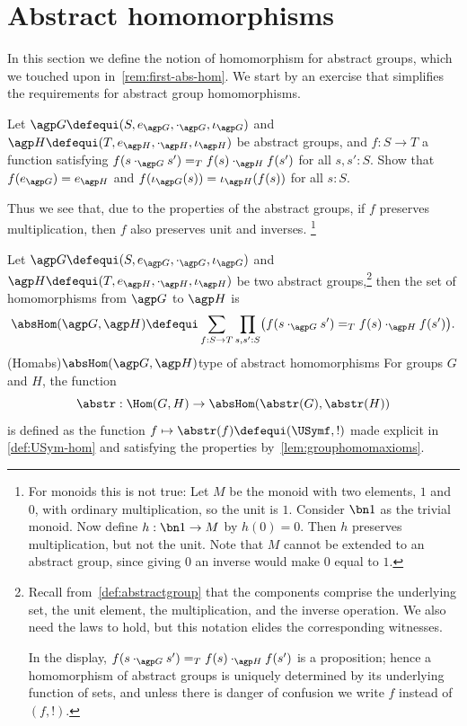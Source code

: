 \section{Abstract homomorphisms}\label{sec:abshom}

In this section we define the notion of homomorphism for
abstract groups, which we touched upon in~\cref{rem:first-abs-hom}.
We start by an exercise
that simplifies the requirements for abstract group homomorphisms.

\begin{xca}\label{{xca:onlymult-hom}}
  Let $\agp G\defequi(S,e_{\agp G},\cdot_{\agp G},\iota_{\agp G})$
  and $\agp H\defequi(T,e_{\agp H},\cdot_{\agp H},\iota_{\agp H})$
  be abstract groups, and $f:S\to T$ a function satisfying
  $f(s\cdot_{\agp G}s')=_Tf(s)\cdot_{\agp H}f(s')$ for all $s,s':S$.
  Show that $f(e_{\agp G}) = e_{\agp H}$ and 
  $f(\iota_{\agp G}(s)) = \iota_{\agp H}(f(s))$ for all $s:S$.
\end{xca}

Thus we see that, due to the properties of the abstract groups,
if $f$ preserves multiplication, then $f$ also preserves unit and inverses.%
\footnote{\label{ft:monoid-hom}For monoids this is not true:
  Let $M$ be the monoid with two elements, $1$ and $0$,
  with ordinary multiplication, so the unit is $1$. 
  Consider $\bn1$ as the trivial monoid.
  Now define $h: \bn1\to M$ by $h(0)=0$. Then $h$ preserves
  multiplication, but not the unit. Note that $M$ cannot
  be extended to an abstract group, since giving $0$
  an inverse would make $0$ equal to $1$.}
  
\begin{definition}\label{def:abstrisfunctor}
  Let $\agp G\defequi(S,e_{\agp G},\cdot_{\agp G},\iota_{\agp G})$
  and $\agp H\defequi(T,e_{\agp H},\cdot_{\agp H},\iota_{\agp H})$
  be two abstract groups,\footnote{%
    Recall from~\cref{def:abstractgroup} that the components comprise
    the underlying set, the unit element, the multiplication,
    and the inverse operation. We also need the laws to hold, 
    but this notation elides the corresponding witnesses.

    In the display, 
    $f(s\cdot_{\agp G}s')=_Tf(s)\cdot_{\agp H}f(s')$ is a proposition; 
    hence a homomorphism of abstract groups is uniquely determined
    by its underlying function of sets, and unless there is danger of
    confusion we write $f$ instead of $(f,!)$.}
  then the set of homomorphisms from $\agp G$ to $\agp H$ is
  \[
    \absHom(\agp G,\agp H)
    \defequi\sum_{f:S\to T}
    \prod_{s,s':S}\bigl(f(s\cdot_{\agp G}s')=_Tf(s)\cdot_{\agp H}f(s')\bigr).
  \]
  \glossary(Homabs){$\protect\absHom(\agp G,\agp H)$}{type of abstract homomorphisms}
  For groups $G$ and $H$, the function
  \[
    \abstr:\Hom(G,H)\to\absHom(\abstr(G),\abstr(H))
  \]
  is defined as the function $f\mapsto \abstr(f)\defequi(\USymf,!)$
  made explicit in \cref{def:USym-hom} and satisfying the
  properties by~\cref{lem:grouphomomaxioms}.
\end{definition}

